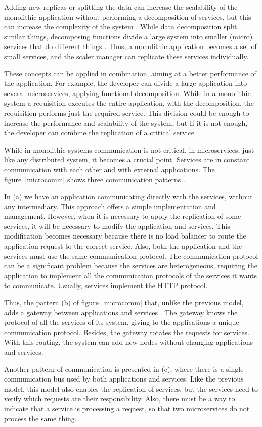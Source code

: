 Adding new replicas or splitting the data can increase the scalability of the monolithic application without performing a decomposition of services, but this can increase the complexity of the system \cite{Namiot2014OnArchitecture}. While data decomposition split similar things, decomposing functions divide a large system into smaller (micro) services that do different things \cite{Namiot2014OnArchitecture}. Thus, a monolithic application becomes a set of small services, and the scaler manager can replicate these services individually.

These concepts can be applied in combination, aiming at a better performance of the application. For example, the developer can divide a large application into several microservices, applying functional decomposition. While in a monolithic system a requisition executes the entire application, with the decomposition, the requisition performs just the required service.  This division could be enough to increase the performance and scalability of the system, but If it is not enough, the developer can combine the replication of a critical service.

While in monolithic systems communication is not critical, in microservices, just like any distributed system, it becomes a crucial point. Services are in constant communication with each other and with external applications. The figure~\ref{microcomm} shows three communication patterns \cite{Namiot2014OnArchitecture}. 

In (a) we have an application communicating directly with the services, without any intermediary. This approach offers a simple implementation and management. However, when it is necessary to apply the replication of some services, it will be necessary to modify the application and services. This modification becomes necessary because there is no load balancer to route the application request to the correct service. Also, both the application and the services must use the same communication protocol. The communication protocol can be a significant problem because the services are heterogeneous, requiring the application to implement all the communication protocols of the services it wants to communicate. Usually, services implement the HTTP protocol.

Thus, the pattern (b) of figure~\ref{microcomm} that, unlike the previous model, adds a gateway between applications and services \cite{Namiot2014OnArchitecture}. The gateway knows the protocol of all the services of its system, giving to the applications a unique communication protocol. Besides, the gateway rotates the requests for services. With this routing, the system can add new nodes without changing applications and services.

Another pattern of communication is presented in (c), where there is a single communication bus used by both applications and services. Like the previous model, this model also enables the replication of services, but the services need to verify which requests are their responsibility. Also, there must be a way to indicate that a service is processing a request, so that two microservices do not process the same thing.